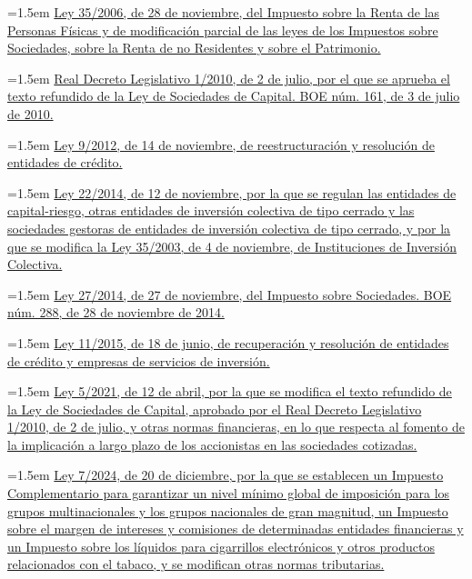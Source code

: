 \documentclass[10pt,a4paper]{article}
\begin{document}
\noindent\hangindent=1.5em \href{https://www.boe.es/eli/es/l/2006/11/28/35/con}{Ley 35/2006, de 28 de noviembre, del Impuesto sobre la Renta de las Personas Físicas y de modificación parcial de las leyes de los Impuestos sobre Sociedades, sobre la Renta de no Residentes y sobre el Patrimonio.}

\noindent\hangindent=1.5em \href{https://www.boe.es/eli/es/rdlg/2010/07/02/1/con}{Real Decreto Legislativo 1/2010, de 2 de julio, por el que se aprueba el texto refundido de la Ley de Sociedades de Capital. BOE núm. 161, de 3 de julio de 2010.}

\noindent\hangindent=1.5em \href{https://www.boe.es/eli/es/l/2012/11/14/9/con}{Ley 9/2012, de 14 de noviembre, de reestructuración y resolución de entidades de crédito.}

\noindent\hangindent=1.5em \href{https://www.boe.es/eli/es/l/2014/11/12/22/con}{Ley 22/2014, de 12 de noviembre, por la que se regulan las entidades de capital-riesgo, otras entidades de inversión colectiva de tipo cerrado y las sociedades gestoras de entidades de inversión colectiva de tipo cerrado, y por la que se modifica la Ley 35/2003, de 4 de noviembre, de Instituciones de Inversión Colectiva.}

\noindent\hangindent=1.5em \href{https://www.boe.es/eli/es/l/2014/11/27/27/con}{Ley 27/2014, de 27 de noviembre, del Impuesto sobre Sociedades. BOE núm. 288, de 28 de noviembre de 2014.}

\noindent\hangindent=1.5em \href{https://www.boe.es/eli/es/l/2015/06/18/11/con}{Ley 11/2015, de 18 de junio, de recuperación y resolución de entidades de crédito y empresas de servicios de inversión.}

\noindent\hangindent=1.5em \href{https://www.boe.es/eli/es/l/2021/04/12/5/con}{Ley 5/2021, de 12 de abril, por la que se modifica el texto refundido de la Ley de Sociedades de Capital, aprobado por el Real Decreto Legislativo 1/2010, de 2 de julio, y otras normas financieras, en lo que respecta al fomento de la implicación a largo plazo de los accionistas en las sociedades cotizadas.}

\noindent\hangindent=1.5em \href{https://www.boe.es/eli/es/l/2024/12/20/7}{Ley 7/2024, de 20 de diciembre, por la que se establecen un Impuesto Complementario para garantizar un nivel mínimo global de imposición para los grupos multinacionales y los grupos nacionales de gran magnitud, un Impuesto sobre el margen de intereses y comisiones de determinadas entidades financieras y un Impuesto sobre los líquidos para cigarrillos electrónicos y otros productos relacionados con el tabaco, y se modifican otras normas tributarias.}
\end{document}
